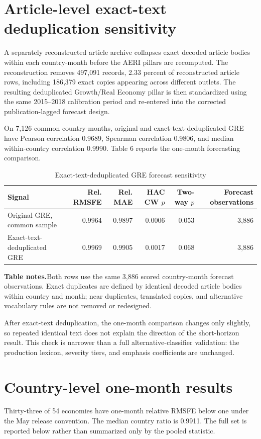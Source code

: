 \documentclass[12pt]{article}
\newcommand{\TableNote}[1]{%
  \par\vspace{0.65ex}\noindent
  \begin{minipage}{0.97\linewidth}\footnotesize\singlespacing\raggedright
  \textbf{Table notes.}\enspace #1
  \end{minipage}}
\begin{document}
\section{Article-level exact-text deduplication sensitivity}
A separately reconstructed article archive collapses exact decoded article bodies within each country-month before the AERI pillars are recomputed. The reconstruction removes 497,091 records, 2.33 percent of reconstructed article rows, including 186,379 exact copies appearing across different outlets. The resulting deduplicated Growth/Real Economy pillar is then standardized using the same 2015--2018 calibration period and re-entered into the corrected publication-lagged forecast design.

On 7,126 common country-months, original and exact-text-deduplicated GRE have Pearson correlation 0.9689, Spearman correlation 0.9806, and median within-country correlation 0.9990. Table 6 reports the one-month forecasting comparison.
\begin{table}[htbp]
\centering\scriptsize
\caption{Exact-text-deduplicated GRE forecast sensitivity}
\begin{tabular}{lrrrrr}
\toprule
Signal & Rel. RMSFE & Rel. MAE & HAC CW $p$ & Two-way $p$ & Forecast observations\\
\midrule
Original GRE, common sample & 0.9964 & 0.9897 & 0.0006 & 0.053 & 3,886\\
Exact-text-deduplicated GRE & 0.9969 & 0.9905 & 0.0017 & 0.068 & 3,886\\
\bottomrule
\end{tabular}
\TableNote{Both rows use the same 3,886 scored country-month forecast observations. Exact duplicates are defined by identical decoded article bodies within country and month; near duplicates, translated copies, and alternative vocabulary rules are not removed or redesigned.}
\end{table}
After exact-text deduplication, the one-month comparison changes only slightly, so repeated identical text does not explain the direction of the short-horizon result. This check is narrower than a full alternative-classifier validation: the production lexicon, severity tiers, and emphasis coefficients are unchanged.


\section{Country-level one-month results}
Thirty-three of 54 economies have one-month relative RMSFE below one under the May release convention. The median country ratio is 0.9911. The full set is reported below rather than summarized only by the pooled statistic.

\end{document}
